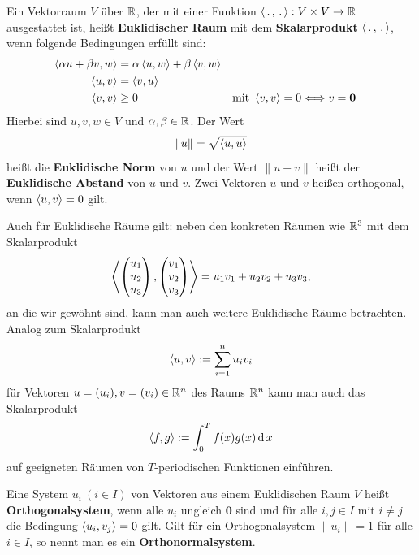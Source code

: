 \begin{defn}
	Ein Vektorraum $V$ über $\mathbb{R}$, der mit einer Funktion $\left< \,.\, , \,.\, \right> : V \times V \to \mathbb{R}$ ausgestattet ist, heißt \textbf{Euklidischer Raum} mit dem \textbf{Skalarprodukt} $\left< \,.\, , \,.\, \right>$, wenn folgende Bedingungen erfüllt sind: 
	\begin{align*}
			\left< \alpha u + \beta v , w \right> & = \alpha \left< u , w \right> + \beta \left< v , w \right> 
			\\ \left< u , v \right> & = \left< v , u \right>
			\\ \left< v , v \right> & \ge 0 & \text{mit} \ \left< v , v \right> & = 0  \Longleftrightarrow v =\mathbf{0}
	\end{align*} 
	Hierbei sind $u,v,w \in V$ und $\alpha,\beta \in \mathbb{R}$. Der Wert 
	\[
		\|u\| = \sqrt{ \left< u , u \right> } 
	\]
	heißt die \textbf{Euklidische Norm} von $u$ und der Wert $\|u-v\|$ heißt der \textbf{Euklidische Abstand} von $u$ und $v$. Zwei Vektoren $u$ und $v$ heißen orthogonal, wenn $\left< u , v \right>=0$ gilt. 
\end{defn} 

\begin{bem}
	Auch für Euklidische Räume gilt: neben den konkreten Räumen wie $\mathbb{R}^3$ mit  dem Skalarprodukt 
	\[
		\left<  \begin{pmatrix} u_1 \\ u_2 \\ u_3 \end{pmatrix}  ,  \begin{pmatrix} v_1 \\ v_2 \\ v_3 \end{pmatrix}  \right> = u_1 v_1 + u_2 v_2 + u_3 v_3,
	\]
	an die wir gewöhnt sind, kann man auch weitere Euklidische Räume betrachten. Analog zum Skalarprodukt 
	\[
		\left< u , v \right> := \sum_{i=1}^n u_i v_i 
	\]
	für Vektoren $u= (u_i) , v = (v_i) \in \mathbb{R}^n$ des Raums $\mathbb{R}^n$ kann man auch das Skalarprodukt 
	\[
			\left< f , g \right> := \int_0^T f(x) g(x) \operatorname{d} x
	\]
	auf geeigneten Räumen von $T$-periodischen Funktionen einführen. 
\end{bem} 

\begin{defn}
	Eine System $u_i \ (i \in I)$ von Vektoren aus einem Euklidischen Raum $V$ heißt \textbf{Orthogonalsystem}, wenn alle $u_i$ ungleich $\textbf{0}$ sind und für alle $i,j \in I$ mit $i \ne j$ die Bedingung $\left< u_i , v_j \right> = 0$ gilt. Gilt für ein Orthogonalsystem $\|u_i\|=1$ für alle $i \in I$, so nennt man es ein \textbf{Orthonormalsystem}. 
\end{defn} 

